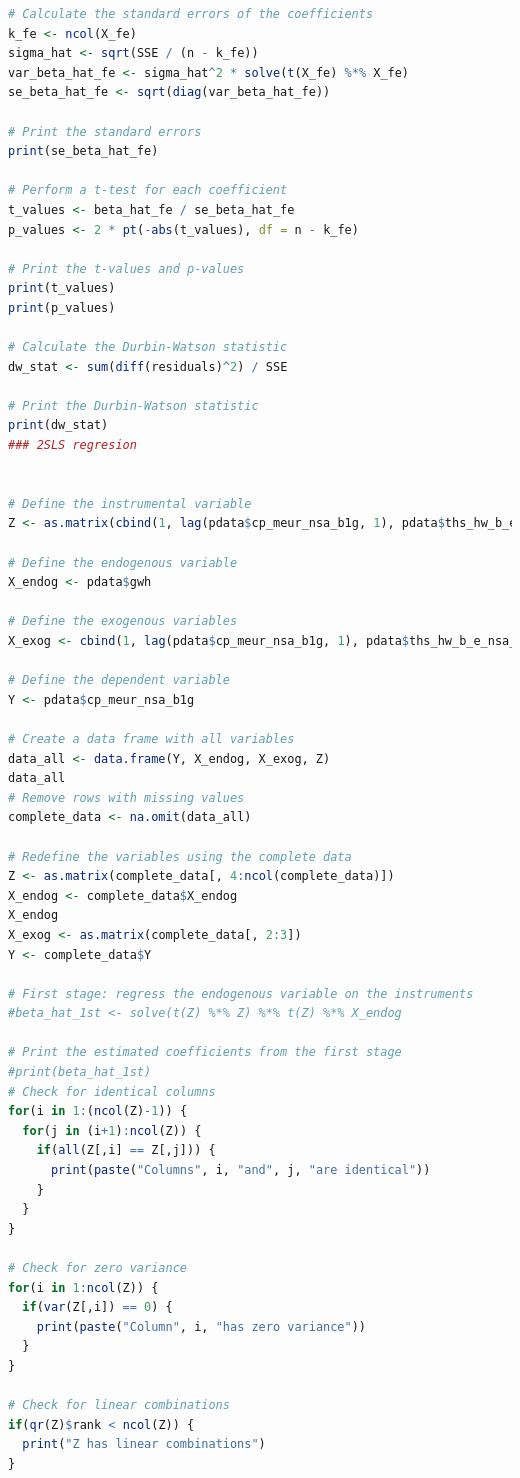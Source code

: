 \documentclass[12pt]{article}
\begin{document}
\begin{lstlisting}[language=R]
# Calculate the standard errors of the coefficients
k_fe <- ncol(X_fe)
sigma_hat <- sqrt(SSE / (n - k_fe))
var_beta_hat_fe <- sigma_hat^2 * solve(t(X_fe) %*% X_fe)
se_beta_hat_fe <- sqrt(diag(var_beta_hat_fe))

# Print the standard errors
print(se_beta_hat_fe)

# Perform a t-test for each coefficient
t_values <- beta_hat_fe / se_beta_hat_fe
p_values <- 2 * pt(-abs(t_values), df = n - k_fe)

# Print the t-values and p-values
print(t_values)
print(p_values)

# Calculate the Durbin-Watson statistic
dw_stat <- sum(diff(residuals)^2) / SSE

# Print the Durbin-Watson statistic
print(dw_stat)
### 2SLS regresion


# Define the instrumental variable
Z <- as.matrix(cbind(1, lag(pdata$cp_meur_nsa_b1g, 1), pdata$ths_hw_b_e_nsa_emp_dc - pdata$exp_e7000_gwh))

# Define the endogenous variable
X_endog <- pdata$gwh

# Define the exogenous variables
X_exog <- cbind(1, lag(pdata$cp_meur_nsa_b1g, 1), pdata$ths_hw_b_e_nsa_emp_dc - pdata$exp_e7000_gwh)

# Define the dependent variable
Y <- pdata$cp_meur_nsa_b1g

# Create a data frame with all variables
data_all <- data.frame(Y, X_endog, X_exog, Z)
data_all
# Remove rows with missing values
complete_data <- na.omit(data_all)

# Redefine the variables using the complete data
Z <- as.matrix(complete_data[, 4:ncol(complete_data)])
X_endog <- complete_data$X_endog
X_endog
X_exog <- as.matrix(complete_data[, 2:3])
Y <- complete_data$Y

# First stage: regress the endogenous variable on the instruments
#beta_hat_1st <- solve(t(Z) %*% Z) %*% t(Z) %*% X_endog

# Print the estimated coefficients from the first stage
#print(beta_hat_1st)
# Check for identical columns
for(i in 1:(ncol(Z)-1)) {
  for(j in (i+1):ncol(Z)) {
    if(all(Z[,i] == Z[,j])) {
      print(paste("Columns", i, "and", j, "are identical"))
    }
  }
}

# Check for zero variance
for(i in 1:ncol(Z)) {
  if(var(Z[,i]) == 0) {
    print(paste("Column", i, "has zero variance"))
  }
}

# Check for linear combinations
if(qr(Z)$rank < ncol(Z)) {
  print("Z has linear combinations")
}


\end{lstlisting}
\end{document}
